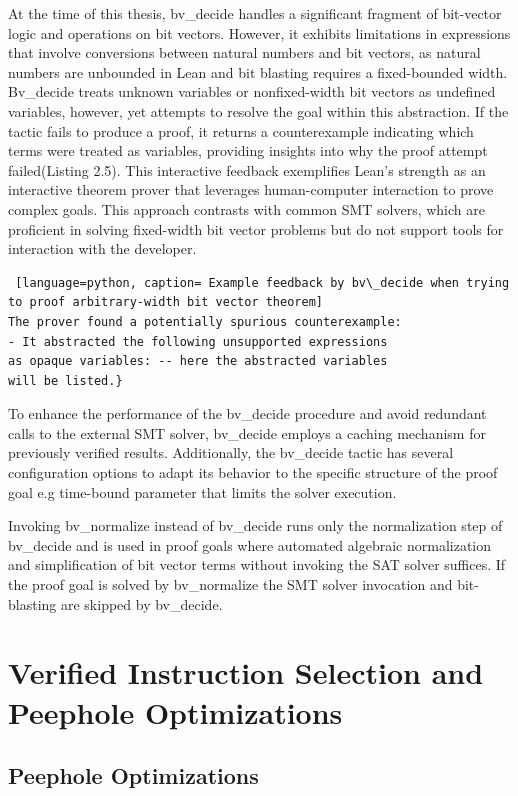 At the time of this thesis, bv\_decide handles a significant fragment of bit-vector logic and operations on bit vectors. However, it exhibits limitations in expressions that involve conversions between natural numbers and bit vectors, as natural numbers are unbounded in Lean and bit blasting requires a fixed-bounded width. Bv\_decide treats unknown variables or nonfixed-width bit vectors as undefined variables, however, yet attempts to resolve the goal within this abstraction. If the tactic fails to produce a proof, it returns a counterexample indicating which terms were treated as variables, providing insights into why the proof attempt failed(Listing 2.5). This interactive feedback exemplifies Lean's strength as an interactive theorem prover that leverages human-computer interaction to prove complex goals. This approach contrasts with common SMT solvers, which are proficient in solving fixed-width bit vector problems but do not support tools for interaction with the developer.


\begin{lstlisting} [language=python, caption= Example feedback by bv\_decide when trying to proof arbitrary-width bit vector theorem]
The prover found a potentially spurious counterexample:
- It abstracted the following unsupported expressions
as opaque variables: -- here the abstracted variables
will be listed.}
\end{lstlisting}





To enhance the performance of the bv\_decide procedure and avoid redundant calls to the external SMT solver, bv\_decide employs a caching mechanism for previously verified results. Additionally, the bv\_decide tactic has several configuration options to adapt its behavior to the specific structure of the proof goal e.g time-bound parameter that limits the solver execution. 

Invoking bv\_normalize instead of bv\_decide runs only the normalization step of bv\_decide  and is used in proof goals where automated algebraic normalization and simplification of bit vector terms without invoking the SAT solver suffices. If the proof goal is solved by bv\_normalize the SMT solver invocation and bit-blasting are skipped by bv\_decide. 
\section{Verified Instruction Selection and Peephole Optimizations } 
\subsection{Peephole Optimizations} 

